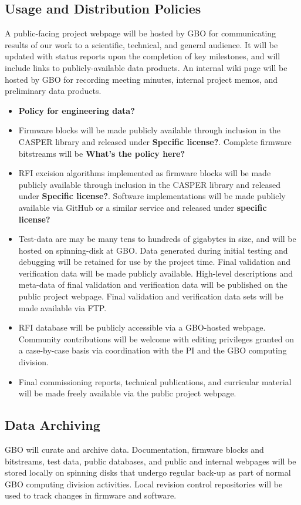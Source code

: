 \documentclass[10pt]{NSF}
\begin{document}
\subsection{Usage and Distribution Policies}

A public-facing project webpage will be hosted by GBO for
communicating results of our work to a scientific, technical, and
general audience.  It will be updated with status reports upon the
completion of key milestones, and will include links to
publicly-available data products.  An internal wiki page will be
hosted by GBO for recording meeting minutes, internal project memos,
and preliminary data products.
\begin{itemize}
\item{\textbf{Policy for engineering data?}}
\item{Firmware blocks will be made publicly available through
  inclusion in the CASPER library and released under \textbf{Specific
    license?}.  Complete firmware bitstreams will be \textbf{What's
    the policy here?}}
\item{RFI excision algorithms implemented as firmware blocks will be
  made publicly available through inclusion in the CASPER library and
  released under \textbf{Specific license?}.  Software implementations
  will be made publicly available via GitHub or a similar service and
  released under \textbf{specific license?}}
\item{Test-data are may be many tens to hundreds of gigabytes in size,
  and will be hosted on spinning-disk at GBO.  Data generated during
  initial testing and debugging will be retained for use by the
  project time.  Final validation and verification data will be made
  publicly available.  High-level descriptions and meta-data of final
  validation and verification data will be published on the public
  project webpage.  Final validation and verification data sets will be
  made available via FTP.}
\item{RFI database will be publicly accessible via a GBO-hosted
  webpage.  Community contributions will be welcome with editing
  privileges granted on a case-by-case basis via coordination with the
  PI and the GBO computing division.}
\item{Final commissioning reports, technical publications, and
  curricular material will be made freely available via the public
  project webpage.}
\end{itemize}

\subsection{Data Archiving}

GBO will curate and archive data.  Documentation, firmware blocks and
bitstreams, test data, public databases, and public and internal
webpages will be stored locally on spinning disks that undergo regular
back-up as part of normal GBO computing division activities.  Local
revision control repositories will be used to track changes in
firmware and software.
\end{document}
